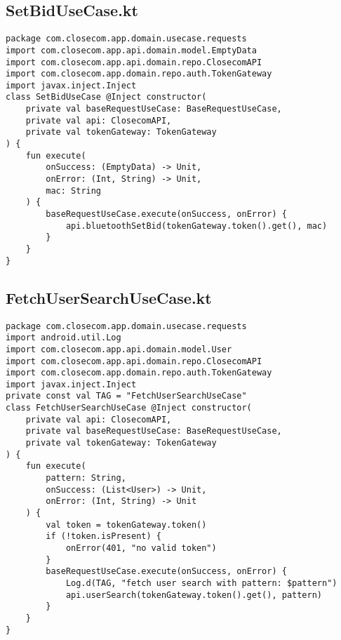 \documentclass[listing]{espd}
\begin{document}
\subsection{SetBidUseCase.kt}
\begin{verbatim}
package com.closecom.app.domain.usecase.requests
import com.closecom.app.api.domain.model.EmptyData
import com.closecom.app.api.domain.repo.ClosecomAPI
import com.closecom.app.domain.repo.auth.TokenGateway
import javax.inject.Inject
class SetBidUseCase @Inject constructor(
    private val baseRequestUseCase: BaseRequestUseCase,
    private val api: ClosecomAPI,
    private val tokenGateway: TokenGateway
) {
    fun execute(
        onSuccess: (EmptyData) -> Unit,
        onError: (Int, String) -> Unit,
        mac: String
    ) {
        baseRequestUseCase.execute(onSuccess, onError) {
            api.bluetoothSetBid(tokenGateway.token().get(), mac)
        }
    }
}
\end{verbatim}

\subsection{FetchUserSearchUseCase.kt}
\begin{verbatim}
package com.closecom.app.domain.usecase.requests
import android.util.Log
import com.closecom.app.api.domain.model.User
import com.closecom.app.api.domain.repo.ClosecomAPI
import com.closecom.app.domain.repo.auth.TokenGateway
import javax.inject.Inject
private const val TAG = "FetchUserSearchUseCase"
class FetchUserSearchUseCase @Inject constructor(
    private val api: ClosecomAPI,
    private val baseRequestUseCase: BaseRequestUseCase,
    private val tokenGateway: TokenGateway
) {
    fun execute(
        pattern: String,
        onSuccess: (List<User>) -> Unit,
        onError: (Int, String) -> Unit
    ) {
        val token = tokenGateway.token()
        if (!token.isPresent) {
            onError(401, "no valid token")
        }
        baseRequestUseCase.execute(onSuccess, onError) {
            Log.d(TAG, "fetch user search with pattern: $pattern")
            api.userSearch(tokenGateway.token().get(), pattern)
        }
    }
}
\end{verbatim}
\end{document}
